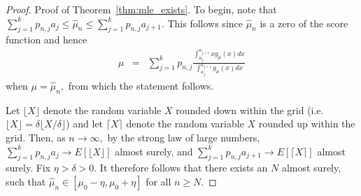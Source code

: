 \documentclass[12pt]{article} %
\begin{document}
\noindent \begin{proof}{Proof of Theorem~\ref{thm:mle_exists}.}
To begin, note that $\sum_{j=1}^k p_{n,j}a_{j} \leq \widehat \mu_n \leq \sum_{j=1}^k p_{n,j}a_{j+1}.$  This follows since $\widehat \mu_n$ is a zero of the score function and hence 
\begin{eqnarray*}
\mu &=& \sum_{j=1}^k p_{n,j} \frac{\int_{a_j}^{a_{j+1}}x g_{\mu}(x)dx}{\int_{a_j}^{a_{j+1}} g_{\mu}(x)dx}
\end{eqnarray*}
when $\mu = \widehat \mu_n,$ from which the statement follows.

Let $\lfloor X \rfloor$ denote the random variable $X$ rounded down within the grid (i.e. $\lfloor X \rfloor = \delta \lfloor X/\delta \rfloor$) and let $\lceil X \rceil$ denote the random variable $X$ rounded up within the grid.   Then, as $n\rightarrow \infty,$ by the strong law of large numbers, $\sum_{j=1}^k p_{n,j}a_{j}\rightarrow E[\lfloor X \rfloor]$ almost surely, and $\sum_{j=1}^k p_{n,j}a_{j+1}\rightarrow E[\lceil X \rceil]$ almost surely.  Fix $\eta>\delta>0$.  It therefore follows that there exists an $N$ almost surely, such that $\widehat \mu_n \in [\mu_0-\eta,  \mu_0+\eta]$ for all $n\geq N.$



\end{proof}
\end{document}
